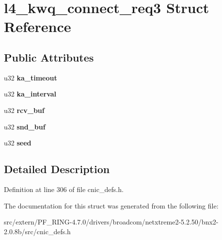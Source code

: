 \hypertarget{structl4__kwq__connect__req3}{
\section{l4\_\-kwq\_\-connect\_\-req3 Struct Reference}
\label{structl4__kwq__connect__req3}
}
\subsection*{Public Attributes}
\begin{DoxyCompactItemize}
\item 
\hypertarget{structl4__kwq__connect__req3_a60d84da345d53305850753ae1f4ffeaa}{
u32 {\bfseries ka\_\-timeout}}
\label{structl4__kwq__connect__req3_a60d84da345d53305850753ae1f4ffeaa}

\item 
\hypertarget{structl4__kwq__connect__req3_ab1beaa63b4d1aead5f0c87d546e85d7d}{
u32 {\bfseries ka\_\-interval}}
\label{structl4__kwq__connect__req3_ab1beaa63b4d1aead5f0c87d546e85d7d}

\item 
\hypertarget{structl4__kwq__connect__req3_a920b2e37229c691af55ce4081e6abc4e}{
u32 {\bfseries rcv\_\-buf}}
\label{structl4__kwq__connect__req3_a920b2e37229c691af55ce4081e6abc4e}

\item 
\hypertarget{structl4__kwq__connect__req3_a3fb8c5097184e57df56257c98e0f63bd}{
u32 {\bfseries snd\_\-buf}}
\label{structl4__kwq__connect__req3_a3fb8c5097184e57df56257c98e0f63bd}

\item 
\hypertarget{structl4__kwq__connect__req3_a83d70bc63d6c4d1badc051174a9425e9}{
u32 {\bfseries seed}}
\label{structl4__kwq__connect__req3_a83d70bc63d6c4d1badc051174a9425e9}

\end{DoxyCompactItemize}


\subsection{Detailed Description}


Definition at line 306 of file cnic\_\-defs.h.



The documentation for this struct was generated from the following file:\begin{DoxyCompactItemize}
\item 
src/extern/PF\_\-RING-\/4.7.0/drivers/broadcom/netxtreme2-\/5.2.50/bnx2-\/2.0.8b/src/cnic\_\-defs.h\end{DoxyCompactItemize}
